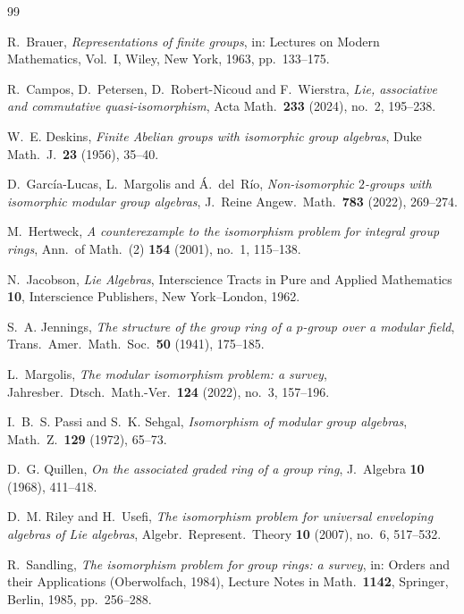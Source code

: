 \documentclass[11pt,reqno]{amsart}
\theoremstyle{plain}
\theoremstyle{remark}
\begin{document}
\begin{thebibliography}{99}

R.~Brauer, \emph{Representations of finite groups}, in: Lectures on Modern
Mathematics, Vol.~I, Wiley, New York, 1963, pp.~133--175.

R.~Campos, D.~Petersen, D.~Robert-Nicoud and F.~Wierstra, \emph{Lie,
associative and commutative quasi-isomorphism}, Acta Math.\ \textbf{233}
(2024), no.~2, 195--238.

W.~E. Deskins, \emph{Finite Abelian groups with isomorphic group algebras},
Duke Math.\ J.\ \textbf{23} (1956), 35--40.

D.~Garc\'ia-Lucas, L.~Margolis and \'A.~del~R\'io, \emph{Non-isomorphic
$2$-groups with isomorphic modular group algebras}, J.~Reine Angew.\ Math.\
\textbf{783} (2022), 269--274.

M.~Hertweck, \emph{A counterexample to the isomorphism problem for integral
group rings}, Ann.\ of Math.\ (2) \textbf{154} (2001), no.~1, 115--138.

N.~Jacobson, \emph{Lie Algebras}, Interscience Tracts in Pure and Applied
Mathematics \textbf{10}, Interscience Publishers, New York--London, 1962.

S.~A. Jennings, \emph{The structure of the group ring of a $p$-group over a
modular field}, Trans.\ Amer.\ Math.\ Soc.\ \textbf{50} (1941), 175--185.

L.~Margolis, \emph{The modular isomorphism problem: a survey}, Jahresber.\
Dtsch.\ Math.-Ver.\ \textbf{124} (2022), no.~3, 157--196.

I.~B.~S. Passi and S.~K. Sehgal, \emph{Isomorphism of modular group
algebras}, Math.\ Z.\ \textbf{129} (1972), 65--73.

D.~G. Quillen, \emph{On the associated graded ring of a group ring},
J.~Algebra \textbf{10} (1968), 411--418.

D.~M. Riley and H.~Usefi, \emph{The isomorphism problem for universal
enveloping algebras of Lie algebras}, Algebr.\ Represent.\ Theory
\textbf{10} (2007), no.~6, 517--532.

R.~Sandling, \emph{The isomorphism problem for group rings: a survey}, in:
Orders and their Applications (Oberwolfach, 1984), Lecture Notes in Math.\
\textbf{1142}, Springer, Berlin, 1985, pp.~256--288.


\end{thebibliography}
\end{document}
